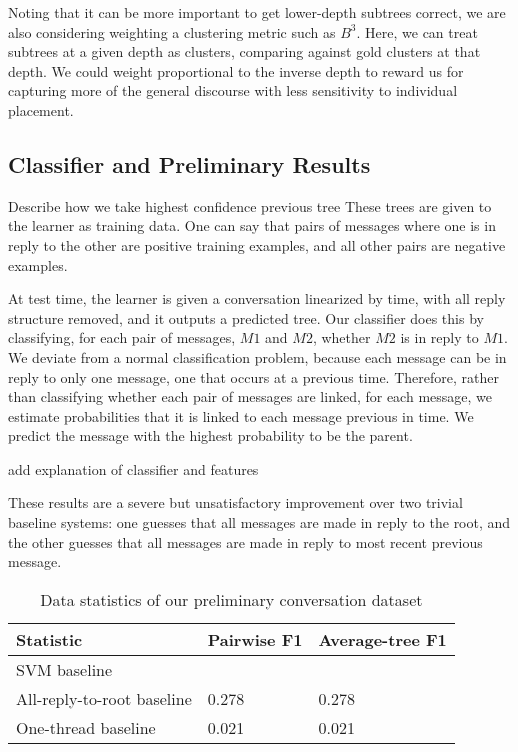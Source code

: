 \documentclass[10pt]{article}
\begin{document}
Noting that it can be more important to get lower-depth subtrees correct, we
are also considering weighting a clustering metric such as $B^3$. Here, we can
treat subtrees at a given depth as clusters, comparing against gold clusters at
that depth. We could weight proportional to the inverse depth to reward us for
capturing more of the general discourse with less sensitivity to individual placement.

\subsection{Classifier and Preliminary Results}
\label{sec:classifier}
{Describe how we take highest confidence previous tree}
These trees are given to the learner as training data. One can say that
pairs of messages where one is in reply to the other are positive training
examples, and all other pairs are negative examples.

At test time, the learner is given a conversation linearized by time, with all
reply structure removed, and it outputs a predicted tree. Our classifier does this
by classifying, for each pair of messages, $M1$ and $M2$, whether $M2$ is in reply
to $M1$. We deviate from a normal classification problem, because each message can
be in reply to only one message, one that occurs at a previous time. Therefore, rather
than classifying whether each pair of messages are linked, for each message, we estimate
probabilities that it is linked to each message previous in time. We predict the
message with the highest probability to be the parent.

{add explanation of classifier and features}

These results are a severe but unsatisfactory improvement over two trivial baseline
systems: one guesses that all messages are made in reply to the root, and the
other guesses that all messages are made in reply to most recent previous message.

\begin{table}[h]\footnotesize
 \begin{tabular}{| l | l | l |} 
   \hline
   \textbf{Statistic} & Pairwise F1 & Average-tree F1 \\
   \hline
    SVM baseline &  & \\
    All-reply-to-root baseline & 0.278 & 0.278 \\
    One-thread baseline & 0.021 & 0.021 \\
   \hline
  \end{tabular}
  \caption{Data statistics of our preliminary conversation dataset}
  \label{table:stats}
\end{table}
\end{document}
